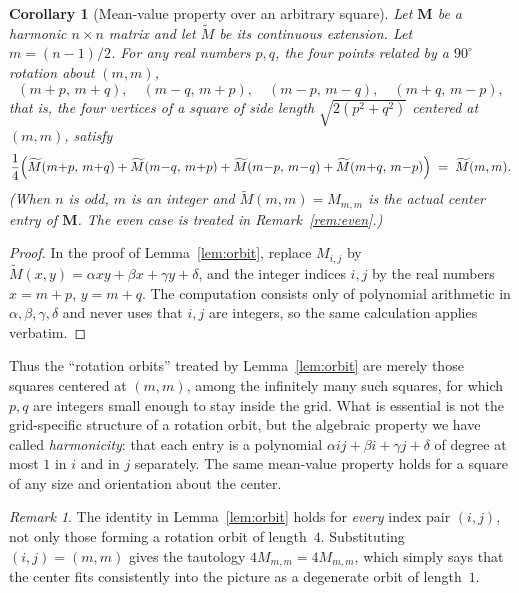 \documentclass[a4paper,11pt]{article}
\theoremstyle{plain}
\newtheorem{corollary}[theorem]{Corollary}
\theoremstyle{definition}
\theoremstyle{remark}
\newtheorem{remark}[theorem]{Remark}
\newcommand{\M}{\mathbf{M}}
\begin{document}
\begin{corollary}[Mean-value property over an arbitrary square]
\label{cor:square}
Let $\M$ be a harmonic $n\times n$ matrix and let $\widetilde M$ be its
continuous extension. Let $m=(n-1)/2$. For any real numbers $p,q$,
the four points related by a $90^\circ$ rotation about $(m,m)$,
\[
  (m+p,\,m+q),\quad (m-q,\,m+p),\quad (m-p,\,m-q),\quad (m+q,\,m-p),
\]
that is, the four vertices of a square of side length $\sqrt{2(p^2+q^2)}$
centered at $(m,m)$, satisfy
\[
  \frac{1}{4}\Bigl(
    \widetilde M(m{+}p,\,m{+}q)
    +\widetilde M(m{-}q,\,m{+}p)
    +\widetilde M(m{-}p,\,m{-}q)
    +\widetilde M(m{+}q,\,m{-}p)
  \Bigr)
  \;=\;\widetilde M(m,m).
\]
(When $n$ is odd, $m$ is an integer and $\widetilde M(m,m)=M_{m,m}$ is
the actual center entry of $\M$. The even case is treated in
Remark~\ref{rem:even}.)
\end{corollary}

\begin{proof}
In the proof of Lemma~\ref{lem:orbit}, replace $M_{i,j}$ by
$\widetilde M(x,y)=\alpha xy+\beta x+\gamma y+\delta$, and the integer
indices $i,j$ by the real numbers $x=m+p$, $y=m+q$. The computation
consists only of polynomial arithmetic in $\alpha,\beta,\gamma,\delta$
and never uses that $i,j$ are integers, so the same calculation applies
verbatim.
\end{proof}

Thus the ``rotation orbits'' treated by Lemma~\ref{lem:orbit} are
merely those squares centered at $(m,m)$, among the infinitely many
such squares, for which $p,q$ are integers small enough to stay inside
the grid. What is essential is not the grid-specific structure of a
rotation orbit, but the algebraic property we have called
\emph{harmonicity}: that each entry is a polynomial
$\alpha ij+\beta i+\gamma j+\delta$ of degree at most $1$ in $i$ and in
$j$ separately. The same mean-value property holds for a square of any
size and orientation about the center.


\begin{remark}
The identity in Lemma~\ref{lem:orbit} holds for \emph{every} index
pair $(i,j)$, not only those forming a rotation orbit of length~$4$.
Substituting $(i,j)=(m,m)$ gives the tautology $4M_{m,m}=4M_{m,m}$,
which simply says that the center fits consistently into the picture
as a degenerate orbit of length~$1$.
\end{remark}



\end{document}
